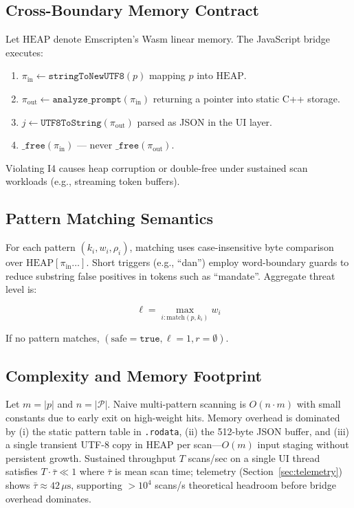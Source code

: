 \documentclass[conference]{IEEEtran}
\begin{document}
\subsection{Cross-Boundary Memory Contract}

Let $\mathrm{HEAP}$ denote Emscripten's Wasm linear memory. The JavaScript bridge executes:

\begin{enumerate}
    \item $\pi_{\mathrm{in}} \leftarrow \texttt{stringToNewUTF8}(p)$ mapping $p$ into $\mathrm{HEAP}$.
    \item $\pi_{\mathrm{out}} \leftarrow \texttt{analyze\_prompt}(\pi_{\mathrm{in}})$ returning a pointer into static C++ storage.
    \item $j \leftarrow \texttt{UTF8ToString}(\pi_{\mathrm{out}})$ parsed as JSON in the UI layer.
    \item $\texttt{\_free}(\pi_{\mathrm{in}})$ --- never $\texttt{\_free}(\pi_{\mathrm{out}})$.
\end{enumerate}

Violating I4 causes heap corruption or double-free under sustained scan workloads (e.g., streaming token buffers).

\subsection{Pattern Matching Semantics}

For each pattern $(k_i, w_i, \rho_i)$, matching uses case-insensitive byte comparison over $\mathrm{HEAP}[\pi_{\mathrm{in}} \ldots]$. Short triggers (e.g., ``dan'') employ word-boundary guards to reduce substring false positives in tokens such as ``mandate''. Aggregate threat level is:

\begin{equation}
\ell = \max_{i : \mathrm{match}(p, k_i)} w_i
\end{equation}

If no pattern matches, $(\text{safe}=\texttt{true}, \ell=1, r=\emptyset)$.

\subsection{Complexity and Memory Footprint}

Let $m = |p|$ and $n = |\mathcal{P}|$. Naive multi-pattern scanning is $O(n \cdot m)$ with small constants due to early exit on high-weight hits. Memory overhead is dominated by (i) the static pattern table in \texttt{.rodata}, (ii) the 512-byte JSON buffer, and (iii) a single transient UTF-8 copy in $\mathrm{HEAP}$ per scan---$O(m)$ input staging without persistent growth. Sustained throughput $T$ scans/sec on a single UI thread satisfies $T \cdot \bar{\tau} \ll 1$ where $\bar{\tau}$ is mean scan time; telemetry (Section~\ref{sec:telemetry}) shows $\bar{\tau} \approx 42\,\mu\mathrm{s}$, supporting $>10^4$ scans/s theoretical headroom before bridge overhead dominates.
\end{document}
